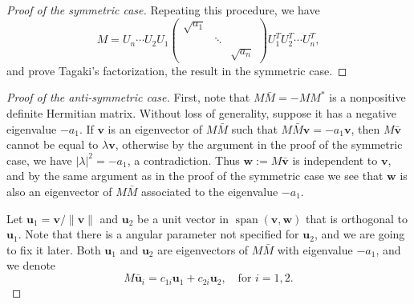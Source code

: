 \documentclass[11pt, a4paper]{article}
\numberwithin{equation}{section}
\renewcommand{\vec}[1]{\mathbf{#1}}
\DeclareMathOperator{\spn}{span}
\theoremstyle{definition}
\theoremstyle{remark}
\begin{document}
\begin{proof}[Proof of the symmetric case]
Repeating this procedure, we have
\begin{equation}
  M = U_n \dotsb U_2 U_1
  \begin{pmatrix}
    \sqrt{a_1} & & \\
     & \ddots & \\
     & & \sqrt{a_n}
  \end{pmatrix}
  U^T_1 U^T_2 \dotsb U^T_n,
\end{equation}
and prove Tagaki's factorization, the result in the symmetric case.
\end{proof}

\begin{proof}[Proof of the anti-symmetric case]
  First, note that $M \bar{M} = -MM^*$ is a nonpositive definite Hermitian matrix. Without loss of generality, suppose it has a negative eigenvalue $-a_1$. If $\vec{v}$ is an eigenvector of $M \bar{M}$ such that $M \bar{M} \vec{v} = -a_1 \vec{v}$, then $M \bar{\vec{v}}$ cannot be equal to $\lambda \vec{v}$, otherwise by the argument in the proof of the symmetric case, we have $\lvert \lambda \rvert^2 = -a_1$, a contradiction. Thus $\vec{w} := M \bar{\vec{v}}$ is independent to $\vec{v}$, and by the same argument as in the proof of the symmetric case we see that $\vec{w}$ is also an eigenvector of $M \bar{M}$ associated to the eigenvalue $-a_1$.

  Let $\vec{u}_1 = \vec{v} / \lVert \vec{v} \rVert$ and $\vec{u}_2$ be a unit vector in $\spn(\vec{v}, \vec{w})$ that is orthogonal to $\vec{u}_1$. Note that there is a angular parameter not specified for $\vec{u}_2$, and we are going to fix it later. Both $\vec{u}_1$ and $\vec{u}_2$ are eigenvectors of $M \bar{M}$ with eigenvalue $-a_1$, and we denote
  \begin{equation}
    M \bar{\vec{u}}_i = c_{1i} \vec{u}_1 + c_{2i} \vec{u}_2, \quad \text{for $i = 1, 2$}.
  \end{equation}


\end{proof}
\end{document}
